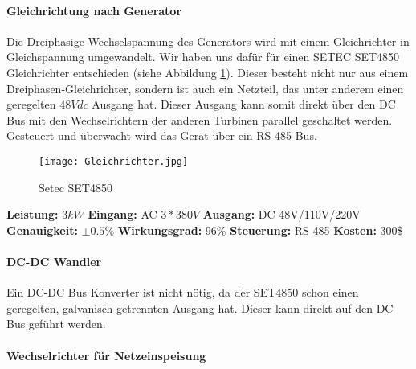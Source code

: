 \paragraph{Gleichrichtung nach Generator}


Die Dreiphasige Wechselspannung des Generators wird mit einem Gleichrichter in Gleichspannung umgewandelt. Wir haben uns dafür für einen SETEC SET4850 Gleichrichter entschieden (siehe Abbildung \ref{fig:Gleichrichter}). Dieser besteht nicht nur aus einem Dreiphasen-Gleichrichter, sondern ist auch ein Netzteil, das unter anderem einen geregelten \(48Vdc\) Ausgang hat. Dieser Ausgang kann somit direkt über den DC Bus mit den Wechselrichtern der anderen Turbinen parallel geschaltet werden. Gesteuert und überwacht wird das Gerät über ein RS 485 Bus.

\begin{figure}[H]
\centering
\texttt{[image: Gleichrichter.jpg]}
\caption{Setec SET4850 \cite{gleichrichter}}
\label{fig:Gleichrichter}
\end{figure}

\textbf{Leistung:}		\(3 kW\) 			\newline
\textbf{Eingang:}		AC \(3 * 380V\) 	\newline
\textbf{Ausgang:}		DC 48V/110V/220V 	\newline
\textbf{Genauigkeit:}	\(\pm 0.5 \%\)		\newline
\textbf{Wirkungsgrad:}	\(96\%\) 			\newline
\textbf{Steuerung:}		RS 485 				\newline
\textbf{Kosten:}		300\$				\newline


\paragraph{DC-DC Wandler}
Ein DC-DC Bus Konverter ist nicht nötig, da der SET4850 schon einen geregelten, galvanisch getrennten Ausgang hat. Dieser kann direkt auf den DC Bus geführt werden.


\paragraph{Wechselrichter für Netzeinspeisung} \label{par:WechselrichterNetz}

